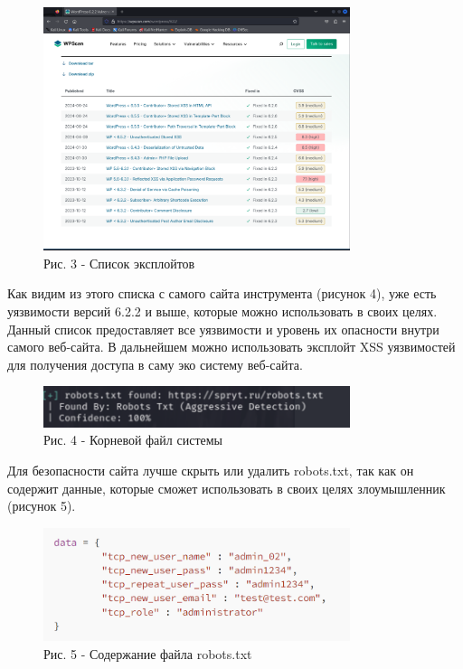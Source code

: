 \begin{figure}[H]
	\centering
	\includegraphics[width=0.8\textwidth]{media/ict/image36}
	\caption*{Рис. 3 - Список эксплойтов}
\end{figure}

\begin{multicols}{2}
Как видим из этого списка с самого сайта инструмента (рисунок 4), уже
есть уязвимости версий 6.2.2 и выше, которые можно использовать в своих
целях. Данный список предоставляет все уязвимости и уровень их опасности
внутри самого веб-сайта. В дальнейшем можно использовать эксплойт XSS
уязвимостей для получения доступа в саму эко систему веб-сайта.
\end{multicols}

\begin{figure}[H]
	\centering
	\includegraphics[width=0.8\textwidth]{media/ict/image37}
	\caption*{Рис. 4 - Корневой файл системы}
\end{figure}

\begin{multicols}{2}
Для безопасности сайта лучше скрыть или удалить robots.txt, так как он
содержит данные, которые сможет использовать в своих целях злоумышленник
(рисунок 5).
\end{multicols}

\begin{figure}[H]
	\centering
	\includegraphics[width=0.8\textwidth]{media/ict/image38}
	\caption*{Рис. 5 - Содержание файла robots.txt}
\end{figure}

